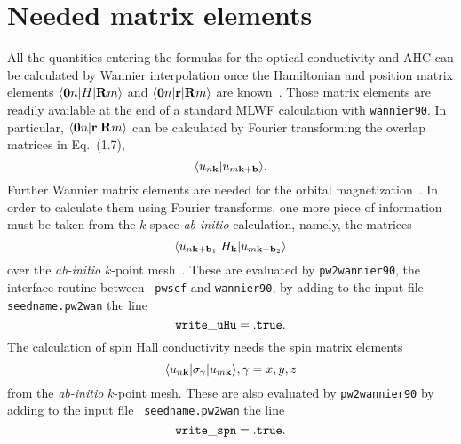 \section{Needed matrix elements}


All the quantities entering the formulas for the optical conductivity
and AHC can be calculated by Wannier interpolation once the
Hamiltonian and position matrix elements $\langle {\bf 0}n\vert H\vert
{\bf R}m\rangle$ and $\langle {\bf 0}n\vert {\bf r}\vert {\bf
  R}m\rangle$ are known~\cite{wang-prb06,yates-prb07}.  Those matrix
elements are readily available at the end of a standard MLWF
calculation with {\tt wannier90}. In particular, $\langle {\bf
  0}n\vert {\bf r}\vert {\bf R}m\rangle$ can be calculated by Fourier
transforming the overlap matrices in Eq.~(1.7),
%
$$\langle u_{n{\bf k}}\vert u_{m{\bf k}+{\bf b}}\rangle.
$$
%
Further Wannier matrix elements are needed for the orbital
magnetization~\cite{lopez-prb12}. In order to calculate them using
Fourier transforms, one more piece of information must be taken from
the $k$-space {\it ab-initio} calculation, namely, the matrices
%
$$\langle u_{n{\bf k}+{\bf b}_1}\vert
H_{\bf k}\vert u_{m{\bf k}+{\bf b}_2}\rangle
$$
%
over the {\it ab-initio} $k$-point mesh~\cite{lopez-prb12}.  These are
evaluated by {\tt pw2wannier90}, the interface routine between {\tt
  pwscf} and {\tt wannier90}, by adding to the input file {\tt
  seedname.pw2wan} the line
%
$${\tt
write\_uHu = .true.
}
$$
The calculation of spin Hall conductivity needs the 
spin matrix elements
%
$$\langle u_{n{\bf k}}\vert \sigma_\gamma \vert u_{m{\bf k}}\rangle, 
\gamma = x, y, z
$$
% 
from the {\it ab-initio} $k$-point mesh. These are also 
evaluated by {\tt pw2wannier90} by adding to the input file {\tt
seedname.pw2wan} the line
%
$${\tt
	write\_spn = .true.
}
$$
 



